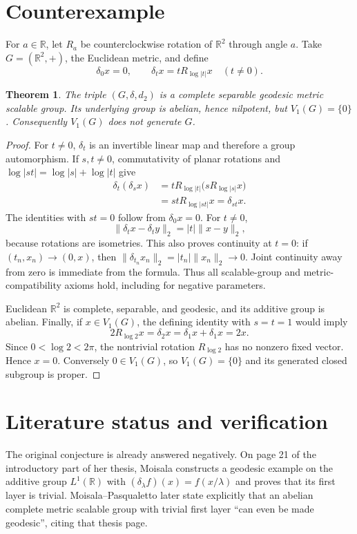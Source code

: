 \documentclass[11pt]{article}
\newtheorem{theorem}{Theorem}
\newcommand{\R}{\mathbb R}
\newcommand{\Vone}{V_1}
\begin{document}
\section{Counterexample}

For $a\in\R$, let $R_a$ be counterclockwise rotation of $\R^2$ through angle
$a$.  Take $G=(\R^2,+)$, the Euclidean metric, and define
\[
 \delta_0x=0,\qquad
 \delta_t x=tR_{\log|t|}x\quad(t\ne0).
\]

\begin{theorem}
The triple $(G,\delta,d_2)$ is a complete separable geodesic metric scalable
group.  Its underlying group is abelian, hence nilpotent, but
$\Vone(G)=\{0\}$.  Consequently $\Vone(G)$ does not generate $G$.
\end{theorem}

\begin{proof}
For $t\ne0$, $\delta_t$ is an invertible linear map and therefore a group
automorphism.  If $s,t\ne0$, commutativity of planar rotations and
$\log|st|=\log|s|+\log|t|$ give
\begin{align*}
 \delta_t(\delta_sx)
 &=tR_{\log|t|}\bigl(sR_{\log|s|}x\bigr)\\
 &=stR_{\log|st|}x=\delta_{st}x.
\end{align*}
The identities with $st=0$ follow from $\delta_0x=0$.  For $t\ne0$,
\[
 \|\delta_t x-\delta_t y\|_2=|t|\|x-y\|_2,
\]
because rotations are isometries.  This also proves continuity at $t=0$:
if $(t_n,x_n)\to(0,x)$, then
$\|\delta_{t_n}x_n\|_2=|t_n|\|x_n\|_2\to0$.
Joint continuity away from zero is immediate from the formula.  Thus all
scalable-group and metric-compatibility axioms hold, including for negative
parameters.

Euclidean $\R^2$ is complete, separable, and geodesic, and its additive group
is abelian.  Finally, if $x\in\Vone(G)$, the defining identity with $s=t=1$
would imply
\[
 2R_{\log2}x=\delta_2x=\delta_1x+\delta_1x=2x.
\]
Since $0<\log2<2\pi$, the nontrivial rotation $R_{\log2}$ has no nonzero
fixed vector.  Hence $x=0$.  Conversely $0\in\Vone(G)$, so
$\Vone(G)=\{0\}$ and its generated closed subgroup is proper.
\end{proof}

\section{Literature status and verification}

The original conjecture is already answered negatively.  On page 21 of the
introductory part of her thesis, Moisala constructs a geodesic example on the
additive group $L^1(\R)$ with
$(\delta_\lambda f)(x)=f(x/\lambda)$ and proves that its first layer is
trivial.  Moisala--Pasqualetto later state explicitly that an abelian complete
metric scalable group with trivial first layer ``can even be made geodesic'',
citing that thesis page.
\end{document}
